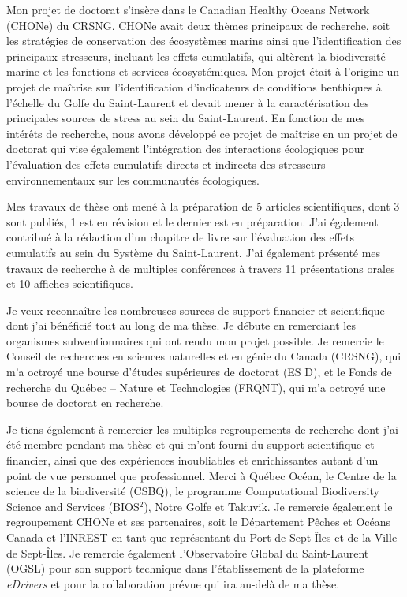 Mon projet de doctorat s'insère dans le Canadian Healthy Oceans Network
(CHONe) du CRSNG. CHONe avait deux thèmes principaux de recherche, soit
les stratégies de conservation des écosystèmes marins ainsi que
l'identification des principaux stresseurs, incluant les effets
cumulatifs, qui altèrent la biodiversité marine et les fonctions et
services écosystémiques. Mon projet était à l'origine un projet de
maîtrise sur l'identification d'indicateurs de conditions benthiques à
l'échelle du Golfe du Saint-Laurent et devait mener à la caractérisation
des principales sources de stress au sein du Saint-Laurent. En fonction
de mes intérêts de recherche, nous avons développé ce projet de maîtrise
en un projet de doctorat qui vise également l'intégration des
interactions écologiques pour l'évaluation des effets cumulatifs directs
et indirects des stresseurs environnementaux sur les communautés
écologiques.

Mes travaux de thèse ont mené à la préparation de 5 articles
scientifiques, dont 3 sont publiés, 1 est en révision et le dernier est
en préparation. J'ai également contribué à la rédaction d'un chapitre de
livre sur l'évaluation des effets cumulatifs au sein du Système du
Saint-Laurent. J'ai également présenté mes travaux de recherche à de
multiples conférences à travers 11 présentations orales et 10 affiches
scientifiques.

Je veux reconnaître les nombreuses sources de support financier et
scientifique dont j'ai bénéficié tout au long de ma thèse. Je débute en
remerciant les organismes subventionnaires qui ont rendu mon projet
possible. Je remercie le Conseil de recherches en sciences naturelles et
en génie du Canada (CRSNG), qui m'a octroyé une bourse d'études
supérieures de doctorat (ES D), et le Fonds de recherche du Québec --
Nature et Technologies (FRQNT), qui m'a octroyé une bourse de doctorat
en recherche.

Je tiens également à remercier les multiples regroupements de recherche
dont j'ai été membre pendant ma thèse et qui m'ont fourni du support
scientifique et financier, ainsi que des expériences inoubliables et
enrichissantes autant d'un point de vue personnel que professionnel.
Merci à Québec Océan, le Centre de la science de la biodiversité (CSBQ),
le programme Computational Biodiversity Science and Services
(BIOS\(^2\)), Notre Golfe et Takuvik. Je remercie également le
regroupement CHONe et ses partenaires, soit le Département Pêches et
Océans Canada et l'INREST en tant que représentant du Port de Sept-Îles
et de la Ville de Sept-Îles. Je remercie également l'Observatoire Global
du Saint-Laurent (OGSL) pour son support technique dans l'établissement
de la plateforme \emph{eDrivers} et pour la collaboration prévue qui ira
au-delà de ma thèse.

